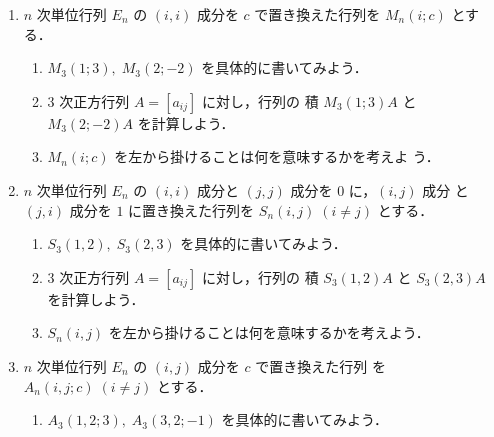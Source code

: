 \documentclass[11pt, uplatex, dvipdfmx]{jsarticle}
\begin{document}
\begin{enumerate}
  \setlength{\itemsep}{1zh}
  
\item \label{trans:mul}$n$ 次単位行列 $E_n$ の $(i,i)$ 成分を $c$ で置き換えた行列を $M_n(i ; c)$ とする．

  \vspace{1ex}

  \begin{enumerate}[(1)]
    \setlength{\itemsep}{1ex}
    
  \item $M_3(1; 3), \; M_3(2; -2)$ を具体的に書いてみよう．

  \item $3$ 次正方行列 $A=\left[ a_{ij}\right]$ に対し，行列の
    積 $M_3(1;3)A$ と $M_3(2; -2) A$ を計算しよう．

  \item $M_n(i;c)$ を左から掛けることは何を意味するかを考えよ
    う．
  \end{enumerate}

\item \label{trans:switch}$n$ 次単位行列 $E_n$ の $(i,i)$ 成分と $(j,j)$ 成分を $0$ に，$(i,j)$ 成分
  と $(j,i)$ 成分を $1$ に置き換えた行列を $S_n(i,j) \; (i \neq j)$ とする．

  
  \vspace{1ex}

  \begin{enumerate}[(1)]
    \setlength{\itemsep}{1ex}
    
  \item $S_3(1,2), \; S_3(2, 3)$ を具体的に書いてみよう．

  \item $3$ 次正方行列 $A=\left[ a_{ij}\right]$ に対し，行列の
    積 $S_3(1,2)A$ と $S_3(2,3)A$ を計算しよう．

  \item $S_n(i,j)$ を左から掛けることは何を意味するかを考えよう．
  \end{enumerate}

\item \label{trans:add}$n$ 次単位行列 $E_n$ の $(i,j)$ 成分を $c$ で置き換えた行列
  を $A_n(i,j;c) \; (i \neq j)$ とする．

  \vspace{1ex}

  \begin{enumerate}[(1)]
    \setlength{\itemsep}{1ex}
    
  \item $A_3(1,2 ; 3), \; A_3(3, 2; -1)$ を具体的に書いてみよう．


\end{enumerate}
\end{enumerate}
\end{document}
